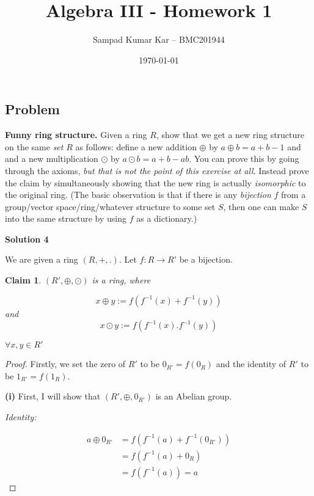 \documentclass[12pt,a4paper]{article}
\title{Algebra III - Homework 1}
\author{Sampad Kumar Kar -- BMC201944}
\date{\today}
\newtheorem{claim}[theorem]{Claim}
\theoremstyle{definition}
\begin{document}
\maketitle

\begin{flushleft}

\setcounter{section}{3}
\section{Problem}

{\bf Funny ring structure.}  Given a ring $R$, show that we get a new ring structure on the same {\it set} $R$ as follows: define a new addition $\oplus$ by $a \oplus b = a + b - 1$ and and a new multiplication $\odot$ by $a \odot b = a + b - ab$. You can prove this by going through the axioms, {\it but that is not the point of this exercise at all}. Instead prove the claim by simultaneously showing that the new ring is actually {\it isomorphic} to the original ring. (The basic observation is that if there is any {\it bijection} $f$ from a group/vector space/ring/whatever structure to some set $S$, then one can make $S$ into the same structure by using $f$ as a dictionary.)

\bigskip

{\bf Solution 4}

\medskip

We are given a ring $(R,+,.)$. Let $f:R\to R'$ be a bijection.

\begin{claim}
	$(R',\oplus,\odot)$ is a ring, where

	$$x\oplus y := f(f^{-1}(x) + f^{-1}(y))$$ and
	$$x \odot y := f(f^{-1}(x).f^{-1}(y))$$

	$\forall x,y \in R'$
\end{claim}

\begin{proof}
	Firstly, we set the zero of $R'$ to be $0_{R'} = f(0_R)$ and the identity of $R'$ to be $1_{R'} = f(1_R)$.

	\medskip

	{\bf (i)} First, I will show that $(R',\oplus,0_{R'})$ is an Abelian group.

	\medskip

	{\it Identity:}

	\begin{align*}
		a \oplus 0_{R'} &= f(f^{-1}(a) + f^{-1}(0_{R'})) \\
		&= f(f^{-1}(a) + 0_R) \\
		&= f(f^{-1}(a)) = a
	\end{align*}


\end{proof}
\end{flushleft}
\end{document}

